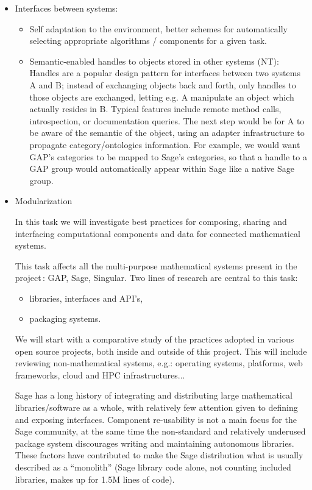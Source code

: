 \begin{Workpackage}{\thewpno}
\begin{WPDescription}
\begin{itemize}
  \item Interfaces between systems:
    \begin{itemize}
    \item Self adaptation to the environment, better schemes for
      automatically selecting appropriate algorithms / components for
      a given task.
    \item Semantic-enabled handles to objects stored in other systems (NT):\\

      Handles are a popular design pattern for interfaces between two
      systems A and B; instead of exchanging objects back and forth,
      only handles to those objects are exchanged, letting e.g. A
      manipulate an object which actually resides in B. Typical
      features include remote method calls, introspection, or
      documentation queries. The next step would be for A to be aware
      of the semantic of the object, using an adapter infrastructure
      to propagate category/ontologies information. For example, we
      would want GAP's categories to be mapped to Sage's categories,
      so that a handle to a GAP group would automatically appear
      within Sage like a native Sage group.
    \end{itemize}

  \item Modularization 

    In this task we will investigate best practices for composing,
    sharing and interfacing computational components and data for
    connected mathematical systems.

    This task affects all the multi-purpose mathematical systems
    present in the project : GAP, Sage, Singular.  Two lines of
    research are central to this task:
    \begin{itemize}
    \item libraries, interfaces and API's,
    \item packaging systems.
    \end{itemize}

    We will start with a comparative study of the practices adopted in
    various open source projects, both inside and outside of this
    project. This will include reviewing non-mathematical systems,
    e.g.: operating systems, platforms, web frameworks, cloud and HPC
    infrastructures...

    Sage has a long history of integrating and distributing large
    mathematical libraries/software as a whole, with relatively few
    attention given to defining and exposing interfaces. Component
    re-usability is not a main focus for the Sage community, at the
    same time the non-standard and relatively underused package system
    discourages writing and maintaining autonomous libraries. These
    factors have contributed to make the Sage distribution what is
    usually described as a ``monolith'' (Sage library code alone, not
    counting included libraries, makes up for 1.5M lines of code).


\end{itemize}
\end{WPDescription}
\end{Workpackage}
